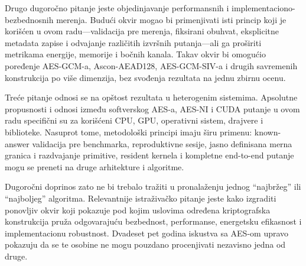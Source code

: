 Drugo dugoročno pitanje jeste objedinjavanje performansnih i
implementaciono-bezbednosnih merenja. Budući okvir mogao bi primenjivati
isti princip koji je korišćen u ovom radu---validacija pre merenja,
fiksirani obuhvat, eksplicitne metadata zapise i odvajanje različitih
izvršnih putanja---ali ga proširiti metrikama energije, memorije i
bočnih kanala. Takav okvir bi omogućio poređenje AES-GCM-a,
Ascon-AEAD128, AES-GCM-SIV-a i drugih savremenih konstrukcija po više
dimenzija, bez svođenja rezultata na jednu zbirnu ocenu.

Treće pitanje odnosi se na opštost rezultata u heterogenim sistemima.
Apsolutne propusnosti i odnosi između softverskog AES-a, AES-NI i CUDA
putanje u ovom radu specifični su za korišćeni CPU, GPU, operativni sistem,
drajvere i biblioteke. Nasuprot tome, metodološki principi imaju širu
primenu: known-answer validacija pre benchmarka, reproduktivne sesije,
jasno definisana merna granica i razdvajanje primitive, resident kernela
i kompletne end-to-end putanje mogu se preneti na druge arhitekture i
algoritme.

Dugoročni doprinos zato ne bi trebalo tražiti u pronalaženju jednog
``najbržeg'' ili ``najboljeg'' algoritma. Relevantnije istraživačko
pitanje jeste kako izgraditi ponovljiv okvir koji pokazuje pod kojim
uslovima određena kriptografska konstrukcija pruža odgovarajuću
bezbednost, performanse, energetsku efikasnost i implementacionu
robustnost. Dvadeset pet godina iskustva sa AES-om upravo pokazuju da se
te osobine ne mogu pouzdano procenjivati nezavisno jedna od druge.